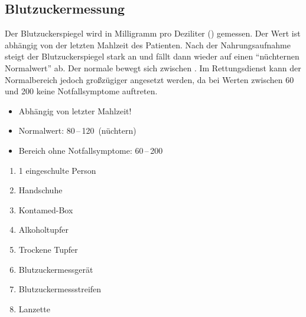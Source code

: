 \subsection{Blutzuckermessung}
\label{topic:blutzucker-messung}

{
Der Blutzuckerspiegel wird in Milligramm pro Deziliter
() gemessen. Der
Wert ist abhängig von der letzten Mahlzeit des Patienten.
Nach der Nahrungsaufnahme steigt der Blutzuckerspiegel
stark an und fällt dann wieder auf einen "`nüchternen
Normalwert"' ab. Der normale
 bewegt sich zwischen
. Im Rettungsdienst
kann der Normalbereich jedoch großzügiger angesetzt werden,
da bei Werten zwischen 60 und 200  keine
Notfallsymptome auftreten.

}{
\begin{itemize}
    \item Abhängig von letzter Mahlzeit!
    \item Normalwert: 80\,--\,120\,
    (nüchtern)
    \item Bereich ohne Notfallsymptome:
    60\,--\,200\,
\end{itemize}
}{}{}{}

{
\begin{enumerate}
  \item 1 eingeschulte Person
  \item Handschuhe
  \item Kontamed-Box
  \item Alkoholtupfer
  \item Trockene Tupfer
  \item Blutzuckermessgerät
  \item Blutzuckermessstreifen
  \item Lanzette
\end{enumerate}
}
{}



